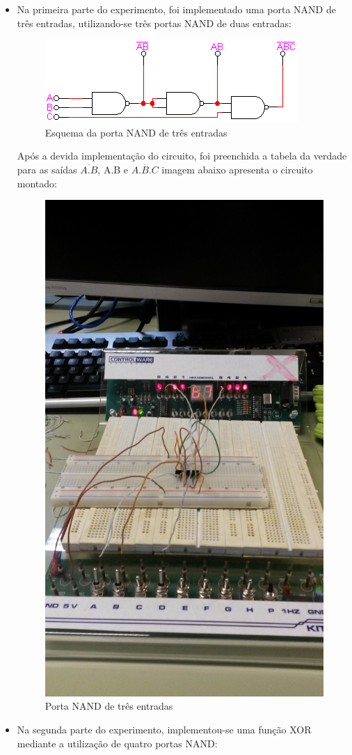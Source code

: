 \documentclass[12pt]{article}
\begin{document}
\begin{itemize}
	\item Na primeira parte do experimento, foi implementado uma porta NAND de três entradas, utilizando-se três portas NAND de duas entradas:
	
	\begin{figure}[H]
		\centering
		\includegraphics[width=.5\textwidth]{portanand3.jpg}
		\caption{Esquema da porta NAND de três entradas}
		\label{fig:exemplo}
	\end{figure}
	
	Após a devida implementação do circuito, foi preenchida a tabela da verdade para as saídas 
	$\overline{A.B}$, A.B e $\overline{A.B.C}$ imagem abaixo apresenta o circuito montado:
	
	\begin{figure}[H]
		\centering
		\includegraphics[width=.5\textwidth]{circuitonand.jpg}
		\caption{Porta NAND de três entradas}
		\label{fig:exemplo}
	\end{figure}
	
	\item Na segunda parte do experimento, implementou-se uma função XOR mediante a utilização de quatro portas NAND:
	

\end{itemize}
\end{document}
